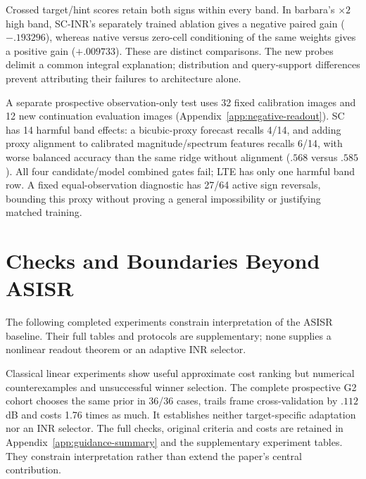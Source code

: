 Crossed target/hint scores retain both signs within every band. In barbara's $\times2$ high band, SC-INR's separately trained ablation gives a negative paired gain ($-.193296$), whereas native versus zero-cell conditioning of the same weights gives a positive gain ($+.009733$). These are distinct comparisons. The new probes delimit a common integral explanation; distribution and query-support differences prevent attributing their failures to architecture alone.

A separate prospective observation-only test uses 32 fixed calibration images and 12 new continuation evaluation images (Appendix~\ref{app:negative-readout}). SC has 14 harmful band effects: a bicubic-proxy forecast recalls 4/14, and adding proxy alignment to calibrated magnitude/spectrum features recalls 6/14, with worse balanced accuracy than the same ridge without alignment ($.568$ versus $.585$). All four candidate/model combined gates fail; LTE has only one harmful band row. A fixed equal-observation diagnostic has 27/64 active sign reversals, bounding this proxy without proving a general impossibility or justifying matched training.


\section{Checks and Boundaries Beyond ASISR}\label{sec:boundary}
The following completed experiments constrain interpretation of the ASISR baseline. Their full tables and protocols are supplementary; none supplies a nonlinear readout theorem or an adaptive INR selector.

Classical linear experiments show useful approximate cost ranking but numerical counterexamples and unsuccessful winner selection. The complete prospective G2 cohort chooses the same prior in 36/36 cases, trails frame cross-validation by $.112$ dB and costs 1.76 times as much. It establishes neither target-specific adaptation nor an INR selector. The full checks, original criteria and costs are retained in Appendix~\ref{app:guidance-summary} and the supplementary experiment tables. They constrain interpretation rather than extend the paper's central contribution.

